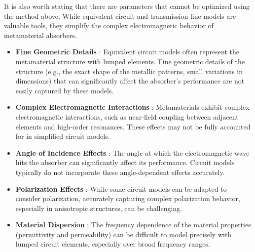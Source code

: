     It is also worth stating that there are parameters that cannot be optimized using the
    method above. While equivalent circuit and transmission line models are valuable tools, 
    they simplify the complex electromagnetic behavior of metamaterial absorbers. 

    \begin{itemize}
        \item \textbf{Fine Geometric Details} : Equivalent circuit models often represent the 
            metamaterial structure with lumped elements. Fine geometric details of the 
            structure (e.g., the exact shape of the metallic patterns, small variations in
            dimensions) that can significantly affect the absorber's performance are not 
            easily captured by these models.
        \item \textbf{Complex Electromagnetic Interactions} : Metamaterials exhibit complex
            electromagnetic interactions, such as near-field coupling between adjacent 
            elements and high-order resonances. These effects may not be fully accounted for 
            in simplified circuit models.
        \item \textbf{Angle of Incidence Effects} : The angle at which the electromagnetic 
            wave hits the absorber can significantly affect its performance. Circuit models
            typically do not incorporate these angle-dependent effects accurately.
        \item \textbf{Polarization Effects} : While some circuit models can be adapted to 
            consider polarization, accurately capturing complex polarization behavior, 
            especially in anisotropic structures, can be challenging.
        \item \textbf{Material Dispersion} : The frequency dependence of the material 
            properties (permittivity and permeability) can be difficult to model precisely 
            with lumped circuit elements, especially over broad frequency ranges.
    \end{itemize}

